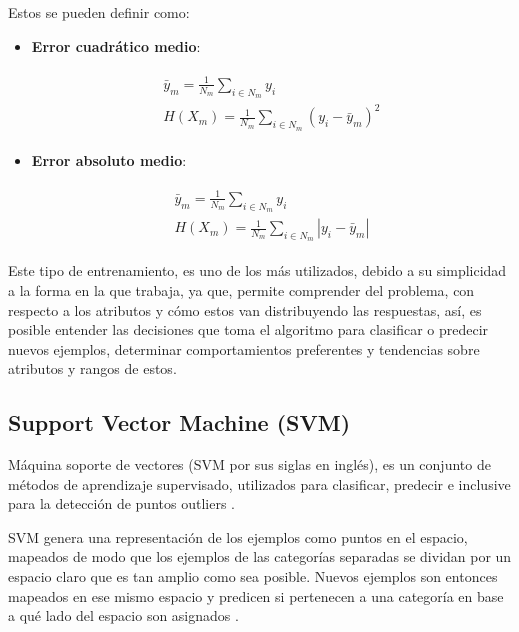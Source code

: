 Estos se pueden definir como:

\begin{itemize}
	
	\item \textbf{Error cuadrático medio}: 
	
	\begin{align}\begin{aligned}\bar{y}_m = \frac{1}{N_m} \sum_{i \in N_m} y_i\\H(X_m) = \frac{1}{N_m} \sum_{i \in N_m} (y_i - \bar{y}_m)^2\end{aligned}\end{align}
	
	\item \textbf{Error absoluto medio}: 
	
	\begin{align}\begin{aligned}\bar{y}_m = \frac{1}{N_m} \sum_{i \in N_m} y_i\\H(X_m) = \frac{1}{N_m} \sum_{i \in N_m} |y_i - \bar{y}_m|\end{aligned}\end{align}
\end{itemize}

Este tipo de entrenamiento, es uno de los más utilizados, debido a su simplicidad a la forma en la que trabaja, ya que, permite comprender del problema, con respecto a los atributos y cómo estos van distribuyendo las respuestas, así, es posible entender las decisiones que toma el algoritmo para clasificar o predecir nuevos ejemplos, determinar comportamientos preferentes y tendencias sobre atributos y rangos de estos.

\subsection{Support Vector Machine (SVM)}

Máquina soporte de vectores (SVM por sus siglas en inglés), es un conjunto de métodos de aprendizaje supervisado, utilizados para clasificar, predecir e inclusive para la detección de puntos outliers  \cite{scholkopf2001learning}. 

SVM genera una representación de los ejemplos como puntos en el espacio, mapeados de modo que los ejemplos de las categorías separadas se dividan por un espacio claro que es tan amplio como sea posible. Nuevos ejemplos son entonces mapeados en ese mismo espacio y predicen si pertenecen a una categoría en base a qué lado del espacio son asignados \cite{scholkopf2001learning}.

